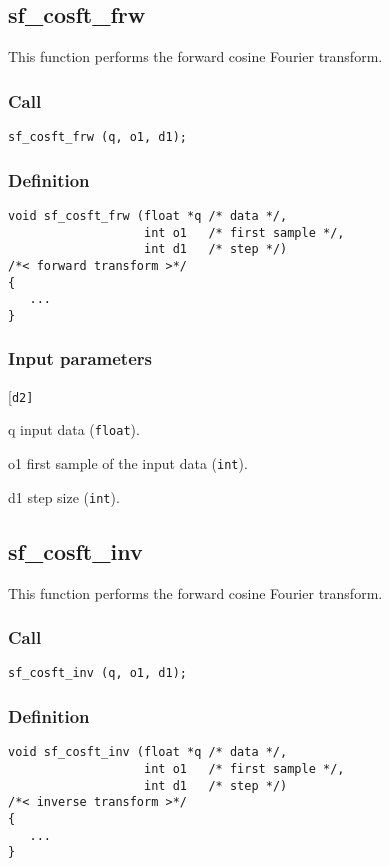 \subsection{{sf\_cosft\_frw}}
This function performs the forward cosine Fourier transform.

\subsubsection*{Call}
\begin{verbatim}sf_cosft_frw (q, o1, d1);\end{verbatim}

\subsubsection*{Definition}
\begin{verbatim}
void sf_cosft_frw (float *q /* data */, 
                   int o1   /* first sample */, 
                   int d1   /* step */) 
/*< forward transform >*/
{
   ...
}
\end{verbatim}

\subsubsection*{Input parameters}
\begin{desclist}{\tt }{\quad}[\tt d2]
   \setlength\itemsep{0pt}
   \item[q]  input data (\texttt{float}). 
   \item[o1] first sample of the input data (\texttt{int}). 
   \item[d1] step size (\texttt{int}).  
\end{desclist}



\subsection{{sf\_cosft\_inv}}
This function performs the forward cosine Fourier transform.

\subsubsection*{Call}
\begin{verbatim}sf_cosft_inv (q, o1, d1);\end{verbatim}

\subsubsection*{Definition}
\begin{verbatim}
void sf_cosft_inv (float *q /* data */, 
                   int o1   /* first sample */, 
                   int d1   /* step */) 
/*< inverse transform >*/
{
   ...
}
\end{verbatim}

